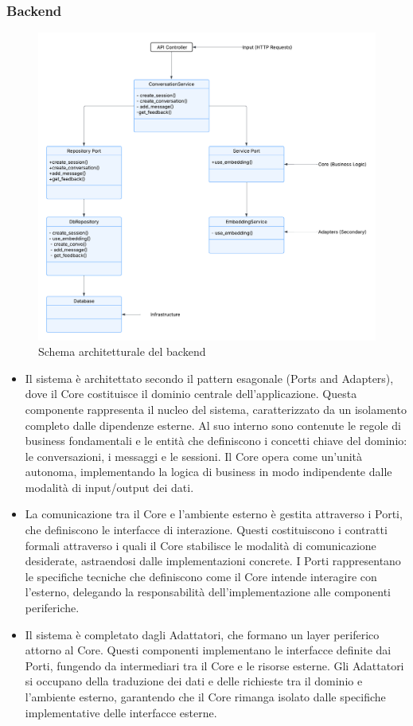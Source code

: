 \subsubsection{Backend}
    \begin{figure}[H]
    \centering
    \includegraphics[width=\textwidth]{images/architettura.png}
    \caption{Schema architetturale del backend}
    \label{fig:architettura}
\end{figure}
\begin{itemize}
\item Il sistema è architettato secondo il pattern esagonale (Ports and Adapters), dove il Core costituisce il dominio centrale dell'applicazione. Questa componente rappresenta il nucleo del sistema, caratterizzato da un isolamento completo dalle dipendenze esterne. Al suo interno sono contenute le regole di business fondamentali e le entità che definiscono i concetti chiave del dominio: le conversazioni, i messaggi e le sessioni. Il Core opera come un'unità autonoma, implementando la logica di business in modo indipendente dalle modalità di input/output dei dati.
\item La comunicazione tra il Core e l'ambiente esterno è gestita attraverso i Porti, che definiscono le interfacce di interazione. Questi costituiscono i contratti formali attraverso i quali il Core stabilisce le modalità di comunicazione desiderate, astraendosi dalle implementazioni concrete. I Porti rappresentano le specifiche tecniche che definiscono come il Core intende interagire con l'esterno, delegando la responsabilità dell'implementazione alle componenti periferiche.
\item Il sistema è completato dagli Adattatori, che formano un layer periferico attorno al Core. Questi componenti implementano le interfacce definite dai Porti, fungendo da intermediari tra il Core e le risorse esterne. Gli Adattatori si occupano della traduzione dei dati e delle richieste tra il dominio e l'ambiente esterno, garantendo che il Core rimanga isolato dalle specifiche implementative delle interfacce esterne.
\end{itemize}
